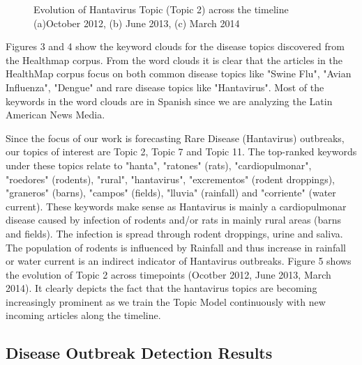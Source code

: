 \documentclass[conference]{IEEEtran}
\begin{document}
\begin{figure}[ht]
\begin{center}
\end{center}
\caption{Evolution of Hantavirus Topic (Topic 2) across the timeline (a)October 2012, (b) June 2013, (c) March 2014}
\label{fig:evolution_clouds}
\end{figure}


Figures 3 and 4 show the keyword clouds for the disease topics discovered from the Healthmap corpus.
From the word clouds it is clear that the articles in the HealthMap corpus focus
on both common disease topics like "Swine Flu", "Avian Influenza", "Dengue" and rare disease topics
like "Hantavirus". Most of the keywords in the word clouds are in Spanish since 
we are analyzing the Latin American News Media.   

Since the focus of our work is forecasting Rare Disease (Hantavirus) outbreaks, 
our topics of interest are Topic 2, Topic 7 and Topic 11. The top-ranked keywords 
under these topics relate to "hanta", "ratones" (rats), "cardiopulmonar", "roedores" (rodents), "rural", 
"hantavirus", "excrementos" (rodent droppings), "graneros" (barns),
"campos" (fields), "lluvia" (rainfall) and "corriente" (water current). These keywords make 
sense as Hantavirus is mainly a cardiopulmonar disease caused by infection of rodents and/or rats 
in mainly rural areas (barns and fields). The infection is spread through rodent droppings, urine and saliva.
The population of rodents is influenced by Rainfall and 
thus increase in rainfall or water current is an indirect indicator of Hantavirus outbreaks.
Figure 5 shows the evolution of Topic 2 across timepoints (Ocotber
2012, June 2013, March 2014). It clearly depicts the fact that the hantavirus topics are becoming increasingly 
prominent as we train the Topic Model continuously with new incoming articles along the timeline.


\subsection{Disease Outbreak Detection Results}
\end{document}
